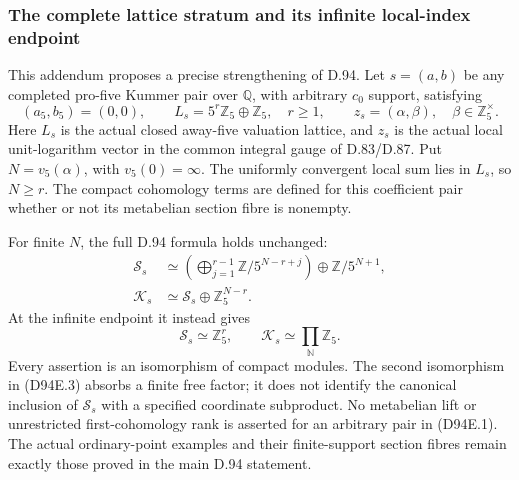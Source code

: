 \subsubsection{The complete lattice stratum and its infinite local-index endpoint}

This addendum proposes a precise strengthening of D.94. Let
\(s=(a,b)\) be any completed pro-five Kummer pair over
\(\mathbb Q\), with arbitrary \(c_0\) support, satisfying
\[
 (a_5,b_5)=(0,0),\qquad
 L_s=5^r\mathbb Z_5\oplus\mathbb Z_5,\quad r\ge1,
 \qquad z_s=(\alpha,\beta),\quad\beta\in\mathbb Z_5^\times.
                                                        \tag{D94E.1}
\]
Here \(L_s\) is the actual closed away-five valuation lattice,
and \(z_s\) is the actual local unit-logarithm vector in the
common integral gauge of D.83/D.87. Put
\(N=v_5(\alpha)\), with \(v_5(0)=\infty\). The uniformly
convergent local sum lies in \(L_s\), so \(N\ge r\).
The compact cohomology terms are defined for this coefficient
pair whether or not its metabelian section fibre is nonempty.

For finite \(N\), the full D.94 formula holds unchanged:
\[
 \begin{aligned}
 \mathcal S_s&\simeq
      \left(\bigoplus_{j=1}^{r-1}\mathbb Z/5^{N-r+j}\right)
                         \oplus\mathbb Z/5^{N+1},\\
 \mathcal K_s&\simeq\mathcal S_s\oplus\mathbb Z_5^{N-r}.
 \end{aligned}                                         \tag{D94E.2}
\]
At the infinite endpoint it instead gives
\[
                \mathcal S_s\simeq\mathbb Z_5^r,
       \qquad \mathcal K_s\simeq\prod_{\mathbb N}\mathbb Z_5.
                                                        \tag{D94E.3}
\]
Every assertion is an isomorphism of compact modules. The
second isomorphism in (D94E.3) absorbs a finite free factor;
it does not identify the canonical inclusion of \(\mathcal S_s\)
with a specified coordinate subproduct. No metabelian lift
or unrestricted first-cohomology rank is asserted for an
arbitrary pair in (D94E.1). The actual ordinary-point examples
and their finite-support section fibres remain exactly those
proved in the main D.94 statement.

